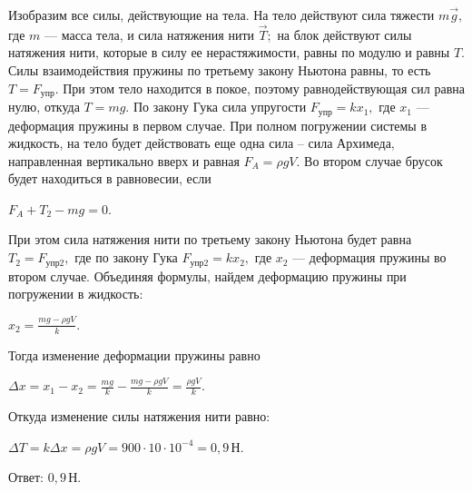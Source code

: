 \documentclass[12pt,a4paper]{article}
\begin{document}
{ Изобразим все силы, действующие на тела. На тело действуют сила тяжести $m\vec g,$ где $m$ — масса тела, и сила натяжения нити $\vec T;$ на блок действуют силы натяжения нити, которые в силу ее нерастяжимости, равны по модулю и равны $T$. Силы взаимодействия пружины по третьему закону Ньютона равны, то есть $T=F_{\text{упр}}.$
При этом тело находится в покое, поэтому равнодействующая сил равна нулю, откуда $T=mg.$ По закону Гука сила упругости $F_{\text{упр}}=kx_1,$ где $x_1$ — деформация пружины в первом случае.
При полном погружении системы в жидкость, на тело будет действовать еще одна сила – сила Архимеда, направленная вертикально вверх и равная $F_A=\rho gV.$ Во втором случае брусок будет находиться в равновесии, если

$F_A+T_2-mg=0.$

При этом сила натяжения нити по третьему закону Ньютона будет равна $T_2=F_{\text{упр}2},$ где по закону Гука $F_{\text{упр}2}=kx_2,$ где $x_2$ — деформация пружины во втором случае.
Объединяя формулы, найдем деформацию пружины при погружении в жидкость:

$x_2=\frac{mg-\rho gV}{k}.$

Тогда изменение деформации пружины равно

$\Delta x=x_1-x_2=\frac{mg}{k}-\frac{mg-\rho gV}{k}=\frac{\rho gV}{k}.$

Откуда изменение силы натяжения нити равно:

$\Delta T=k\Delta x=\rho gV=900\cdot10\cdot10^{-4}=0{,}9\,\text{Н}.$

Ответ: $0{,}9\,\text{Н}$.
}
\end{document}
